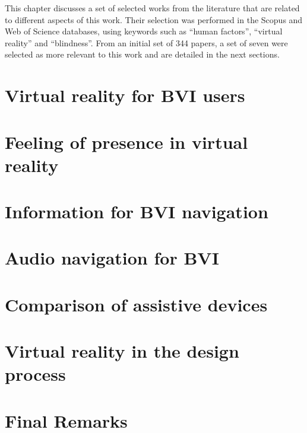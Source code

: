 This chapter discusses a set of selected works from the literature that are related to different aspects of this work. Their selection was performed in the Scopus and Web of Science databases, using keywords such as “human factors”, “virtual reality” and “blindness”. From an initial set of 344 papers, a set of seven were selected as more relevant to this work and are detailed in the next sections.

\section{Virtual reality for BVI users}
\label{sec:vr_without_vision}


\section{Feeling of presence in virtual reality}
\label{sec:emotion_presence_vr}


\section{Information for BVI navigation}
\label{sec:bradley_dunlop}


\section{Audio navigation for BVI}
\label{sec:auditory_navigation}


\section{Comparison of assistive devices}
\label{sec:evaluation_spatial_display}


\section{Virtual reality in the design process}
\label{sec:vr_cabin}


\section{Final Remarks}
\label{sec:final_remarks3}

